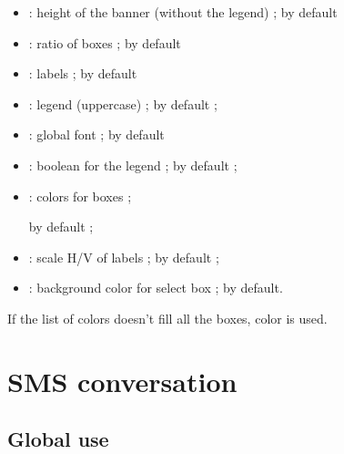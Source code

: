 \documentclass[english,11pt,a4paper]{article}
\begin{document}
\begin{itemize}
	\item {} : height of the banner (without the legend) ;  by default
	\item {} : ratio of boxes ;  by default
	\item {} : labels ;  by default
	\item {} : legend (uppercase) ;  by default ;
	\item {} : global font ;  by default
	\item {} : boolean for the legend ;   by default ;
	\item {} : colors for boxes ;
	
	\hfill{} by default ;
	\item {} : scale H/V of labels ;   by default ;
	\item {} : background color for select box  ;   by default.
\end{itemize}

\smallskip

If the list of colors doesn't fill all the boxes,  color is used.

\begin{demohigh}[language=latex/latex3,style/main=teal!25,style/code=teal!25]
\end{demohigh}

\begin{demohigh}[language=latex/latex3,style/main=teal!25,style/code=teal!25,style/demo=yellow!25]
\def\lstcouleurs{colorNS1,colorNS2,colorNS3,colorNS4,colorNS5,purple}
\ScoreBanner%
  [ScaleSymbols={1.33,2},Height=3.25,ShowLegend=false,Ratio=0.75,
  Symbols={1,2,3,4,5,6},Colors=\lstcouleurs,
  Colbg=yellow!25]{1}
\end{demohigh}

\pagebreak

\section{SMS conversation}

\subsection{Global use}
\end{document}
